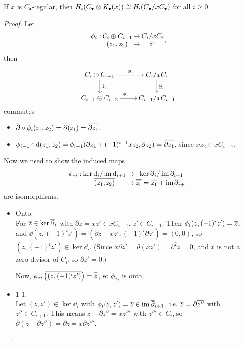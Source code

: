 \begin{prop}
  If $x$ is $C_\bullet$-regular, then $H_i(C_\bullet \otimes K_\bullet(x)) \cong H_i(C_\bullet / x C_\bullet)$ 
  for all $i \ge 0$.

  \begin{proof}
    Let 
    $$
    \deffunc{\phi_i}{C_i \Op C_{i-1}}{C_i / x C_i}{(z_1, z_2)}{\ob{z_1}},
    $$
    then
    $$
    \begin{tikzcd}[cramped]
      C_i \Op C_{i-1} \ar[r, "\phi_i"] \ar[d, "\dd_i"] & C_i/x C_i \ar[d, "\ob{\partial}_i"] \\
      C_{i-1} \Op C_{i-2} \ar[r, "\phi_{i-1}"] & C_{i-1}/x C_{i-1} 
    \end{tikzcd}
    $$
    commutes.
    \begin{itemize}
      \item $\overline{\partial} \circ \phi_i(z_1, z_2) = \overline{\partial}(z_1) = \overline{\partial z_1}$.
      \item $\phi_{i-1} \circ \mathrm{d} (z_1, z_2) = \phi_{i-1}(\partial z_1 + (-1)^{i-1} xz_2, \partial z_2)
        = \overline{\partial z_1}$, since $xz_2 \in xC_{i-1}$.
    \end{itemize}

    Now we need to show the induced maps
    $$
    \deffunc{\phi_{*i}}{\ker \dd_i / \im \dd_{i+1}}{\ker \ob{\partial}_i / \im \ob{\partial}_{i+1}}
    {\ob{(z_1, z_2)}}{\ob{\ob{z_1}} = \ob{z_1} + \im \ob{\partial}_{i+1}}
    $$
    are isomorphisms.

    \begin{itemize}
      \item Onto: \\
        For $\overline{z} \in \ker \overline{\partial}_i$ with $\partial z = xz' \in xC_{i-1}$, 
        $z' \in C_{i-1}$.
        Then $\phi_i(z, (-1)^i z') = \overline{z}$, and 
        $\dd(z, (-1)^i z') = (\partial z - xz', (-1)^i \partial z') = (0, 0)$, so
        $(z, (-1)^i z') \in \ker \dd_i$.
        (Since $x \partial z' = \partial(xz') = \partial^2 z = 0$, and $x$ is not a
        zero divisor of $C_i$, so $\partial z' = 0$.)

        Now, $\phi_{*i} \left( \overline{(z, (-1)^i z')} \right) = \overline{\overline{z}}$, so $\phi_{*i}$ is onto.

      \item 1-1: \\
        Let $(z, z') \in \ker \dd_i$ with $\phi_i(z, z') = \overline{z} \in \operatorname{im} \overline{\partial}_{i+1}$, i.e.
        $\overline{z} = \partial \overline{z''}$ with $z'' \in C_{i+1}$.
        This means $z - \partial z'' = x z'''$ with $z''' \in C_i$, so
        $\partial (z - \partial z'') = \partial z = x \partial z'''$.


\end{itemize}
\end{proof}
\end{prop}
